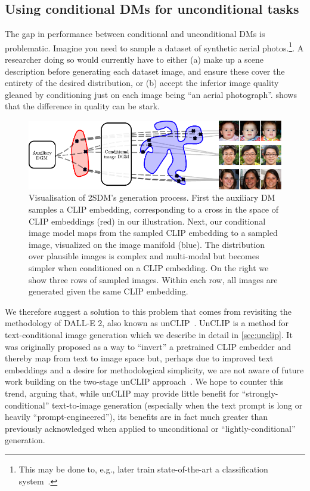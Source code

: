 \subsection{Using conditional DMs for unconditional tasks} \label{sec:2sdm-2sdm-method}

The gap in performance between conditional and unconditional DMs is problematic. Imagine you need to sample a dataset of synthetic aerial photos.\footnote{ This may be done to, e.g., later train state-of-the-art a classification system~\citep{azizi2023synthetic}.}. A researcher doing so would currently have to either (a) make up a scene description before generating each dataset image, and ensure these cover the entirety of the desired distribution, or (b) accept the inferior image quality gleaned by conditioning just on each image being ``an aerial photograph''.   shows that the difference in quality can be stark.

\begin{figure}[t]
    \centering
    \includegraphics[width=\textwidth]{figs/2sdm/vcdm-diagram.pdf}
    \caption{Visualisation of 2SDM's generation process. First the auxiliary DM samples a CLIP embedding, corresponding to a cross in the space of CLIP embeddings (red) in our illustration. Next, our conditional image model maps from the sampled CLIP embedding to a sampled image, visualized on the image manifold (blue). The distribution over plausible images is complex and multi-modal but becomes simpler when conditioned on a CLIP embedding. On the right we show three rows of sampled images. Within each row, all images are generated given the same CLIP embedding.}
    \label{fig:samples}
\end{figure}

We therefore suggest a solution to this problem that comes from revisiting the methodology of DALL-E 2, also known as unCLIP~\citep{ramesh2022hierarchical}. UnCLIP is a method for text-conditional image generation which we describe in detail in \cref{sec:unclip}. It was originally proposed as a way to ``invert'' a pretrained CLIP embedder and thereby map from text to image space but, perhaps due to improved text embeddings and a desire for methodological simplicity, we are not aware of future work building on the two-stage unCLIP approach~\citep{rombach2022high,chang2023muse,hoogeboom2023simple}. We hope to counter this trend, arguing that, while unCLIP may provide little benefit for ``strongly-conditional'' text-to-image generation (especially when the text prompt is long or heavily ``prompt-engineered''), its benefits are in fact much greater than previously acknowledged when applied to unconditional or ``lightly-conditional'' generation.

